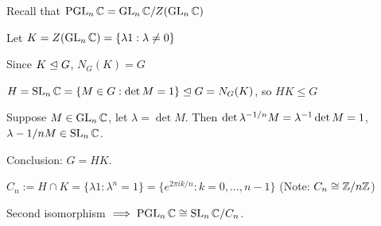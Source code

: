 \begin{ex}
Recall that $\operatorname{PGL}_n \mathbb{C} = \operatorname{GL}_n \mathbb{C} /Z (\operatorname{GL}_n \mathbb{C})$

Let $K= Z(\operatorname{GL}_n\mathbb{C})= \{\lambda 1: \lambda\ne 0\}$

Since $K\trianglelefteq G$, $N_G(K)=G$

$H=\operatorname{SL}_n \mathbb{C}=\{M\in G:\det M=1\}\trianglelefteq G = N_G(K)$, so $HK\le G$

Suppose $M\in \operatorname{GL}_n \mathbb{C}$, let $\lambda = \det M$. Then $\det \lambda^{-1/n}M =\lambda^{-1} \det M = 1$, $\lambda-1 /nM \in \operatorname{SL}_n \mathbb{C}$.

Conclusion: $G=HK$.

$C_n:=H\cap K= \{\lambda 1: \lambda^n=1\}= \{e^{2\pi ik/n}: k = 0,\ldots, n-1\}$ (Note: $C_n \cong \mathbb Z/n\mathbb Z$)

Second isomorphism $\implies \operatorname{PGL}_n \mathbb{C} \cong \operatorname{SL}_n \mathbb{C}/C_n$.
\end{ex}


\printindex


 